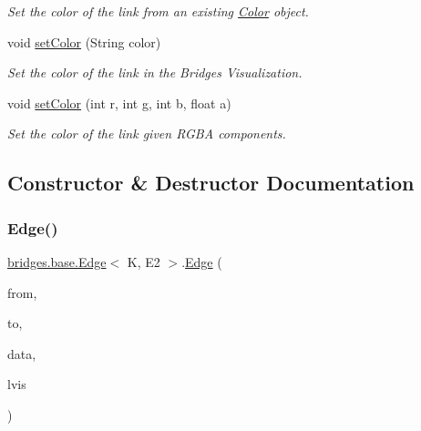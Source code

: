 \begin{DoxyCompactItemize}
\begin{DoxyCompactList}\small\item\em Set the color of the link from an existing \mbox{\hyperlink{classbridges_1_1base_1_1_color}{Color}} object. \end{DoxyCompactList}\item 
void \mbox{\hyperlink{classbridges_1_1base_1_1_edge_adc2dbd9f8d74f8749ba64515ca052909}{set\+Color}} (String color)
\begin{DoxyCompactList}\small\item\em Set the color of the link in the Bridges Visualization. \end{DoxyCompactList}\item 
void \mbox{\hyperlink{classbridges_1_1base_1_1_edge_a4ecf6bdaf140202b41c8a929fbdcdc0c}{set\+Color}} (int r, int g, int b, float a)
\begin{DoxyCompactList}\small\item\em Set the color of the link given R\+G\+BA components. \end{DoxyCompactList}\end{DoxyCompactItemize}


\subsection{Constructor \& Destructor Documentation}
\mbox{\label{classbridges_1_1base_1_1_edge_a2a17f458612fbcee8e9efb8d91a6cc18}} 
\subsubsection{\texorpdfstring{Edge()}{Edge()}}
{\footnotesize\ttfamily \mbox{\hyperlink{classbridges_1_1base_1_1_edge}{bridges.\+base.\+Edge}}$<$ K, E2 $>$.\mbox{\hyperlink{classbridges_1_1base_1_1_edge}{Edge}} (\begin{DoxyParamCaption}\item[{K}]{from,  }\item[{K}]{to,  }\item[{E2}]{data,  }\item[{\mbox{\hyperlink{classbridges_1_1base_1_1_link_visualizer}{Link\+Visualizer}}}]{lvis }\end{DoxyParamCaption})}



